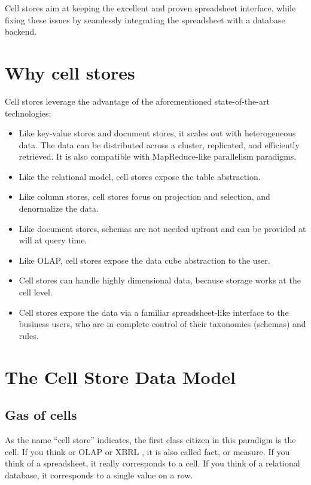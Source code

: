 \documentclass{vldb}
\begin{document}
Cell stores aim at keeping the excellent and proven spreadsheet interface, while fixing these issues by seamlessly integrating the spreadsheet with a database backend.

\section{Why cell stores}
\label{section-why}

Cell stores leverage the advantage of the aforementioned state-of-the-art technologies:

\begin{itemize}
\item Like key-value stores and document stores, it scales out with heterogeneous data. The data can be distributed across a cluster, replicated, and efficiently retrieved. It is also compatible with MapReduce-like parallelism paradigms.
\item Like the relational model, cell stores expose the table abstraction.
\item Like column stores, cell stores focus on projection and selection, and denormalize the data. 
\item Like document stores, schemas are not needed upfront and can be provided at will at query time.
\item Like OLAP, cell stores expose the data cube abstraction to the user.
\item Cell stores can handle highly dimensional data, because storage works at the cell level.
\item Cell stores expose the data via a familiar spreadsheet-like interface to the business users, who are in complete control of their taxonomies (schemas) and rules.
\end{itemize}

\section{The Cell Store Data Model}
\label{section-data-model}

\subsection{Gas of cells}

As the name ``cell store'' indicates, the first class citizen in this paradigm is the cell. If you think or OLAP \cite{OLAP} or XBRL \cite{XBRL}, it is also called fact, or measure. If you think of a spreadsheet, it really corresponds to a cell. If you think of a relational database, it corresponds to a single value on a row.
\end{document}
